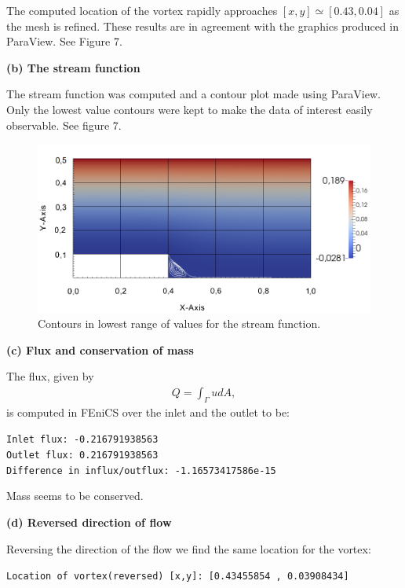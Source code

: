 \documentclass[11pt,a4paper,english]{article}
\numberwithin{equation}{section}
\begin{document}
The computed location of the vortex rapidly approaches $[x,y] \simeq [0.43, 0.04]$ as the mesh is refined. These results are in agreement with the graphics produced in ParaView. See Figure 7. 


\textbf{(b) The stream function}

The stream function was computed and a contour plot made using ParaView. Only the lowest value contours were kept to make the data of interest easily observable. See figure 7. 

\begin{figure}[h!]
\begin{center}
  \includegraphics[scale=0.30]{psi_step.png}
  \end{center}
  \caption{Contours in lowest range of values for the stream function.}
\end{figure}

\textbf{(c) Flux and conservation of mass}

The flux, given by 
\begin{align*}
Q = \int_{\Gamma} u dA,
\end{align*}
is computed in FEniCS over the inlet and the outlet to be:

\noindent
\texttt{Inlet flux:  -0.216791938563} \\
\texttt{Outlet flux:  0.216791938563} \\
\texttt{Difference in influx/outflux: -1.16573417586e-15}

Mass seems to be conserved. 


\textbf{(d) Reversed direction of flow}

Reversing the direction of the flow we find the same location for the vortex:

\texttt{Location of vortex(reversed) [x,y]:  [0.43455854 , 0.03908434] }
\end{document}
